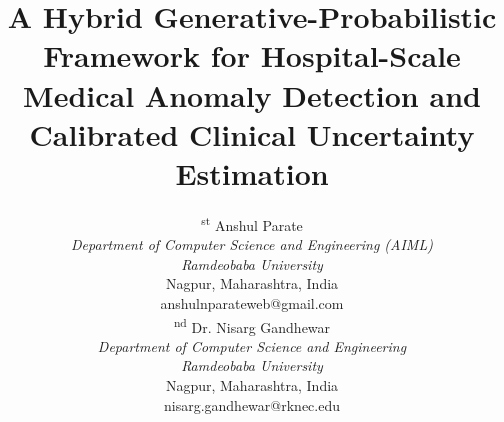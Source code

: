 \documentclass[conference]{IEEEtran}
\begin{document}
\title{A Hybrid Generative-Probabilistic Framework for Hospital-Scale Medical Anomaly Detection and Calibrated Clinical Uncertainty Estimation}

\author{
\begin{minipage}[t]{0.48\textwidth}
\textsuperscript{st} Anshul Parate \\
\textit{\small Department of Computer Science and Engineering (AIML)} \\
\textit{\small Ramdeobaba University}\\
\small Nagpur, Maharashtra, India \\
\small anshulnparateweb@gmail.com
\end{minipage}%
\hfill
\begin{minipage}[t]{0.48\textwidth}
\textsuperscript{nd} Dr. Nisarg Gandhewar \\
\textit{\small Department of Computer Science and Engineering} \\
\textit{\small Ramdeobaba University}\\
\small Nagpur, Maharashtra, India \\
\small nisarg.gandhewar@rknec.edu
\end{minipage}
}

\maketitle
\end{document}
